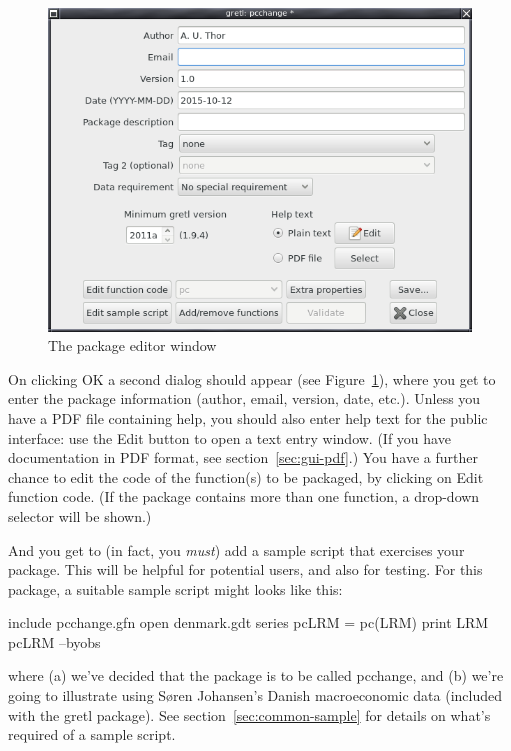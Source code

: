 \documentclass[oneside]{book}
\begin{document}
\begin{figure}[htbp]
  \centering
  \includegraphics[scale=0.55]{figures/package_editor}
  \caption{The package editor window}
  \label{fig:package_editor}
\end{figure}

On clicking \textsf{OK} a second dialog should appear (see
Figure~\ref{fig:package_editor}), where you get to enter the package
information (author, email, version, date, etc.). Unless you have a
PDF file containing help, you should also enter help text for the
public interface: use the \textsf{Edit} button to open a text entry
window. (If you have documentation in PDF format, see
section~\ref{sec:gui-pdf}.) You have a further chance to edit the code
of the function(s) to be packaged, by clicking on \textsf{Edit
  function code}.  (If the package contains more than one function, a
drop-down selector will be shown.)

And you get to (in fact, you \textit{must}) add a sample script that
exercises your package.  This will be helpful for potential users, and
also for testing. For this package, a suitable sample script might
looks like this:
%
\begin{code}
include pcchange.gfn
open denmark.gdt
series pcLRM = pc(LRM)
print LRM pcLRM --byobs
\end{code}
%
where (a) we've decided that the package is to be called
\textsf{pcchange}, and (b) we're going to illustrate using S\o{}ren
Johansen's Danish macroeconomic data (included with the gretl
package). See section~\ref{sec:common-sample} for details on what's
required of a sample script.
\end{document}
